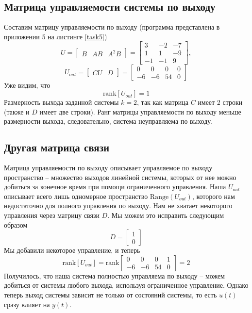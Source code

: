 \documentclass[a4paper, 12pt]{article}
\begin{document}
    \subsection{Матрица управляемости системы по выходу}
    Составим матрицу управляемости по выходу (программа представлена в приложении 5 на листинге \ref{task5})
    $$
    U=\begin{bmatrix}
        B &AB & A^2B
    \end{bmatrix}=\begin{bmatrix}
        3    &-2    &-7\\
     1     &1    &-9\\
    -1    &-1     &9
    \end{bmatrix},
    $$
    $$
    U_{out}=\begin{bmatrix}
        CU &D
    \end{bmatrix}=\begin{bmatrix}
        0     &0     &0     &0\\
    -6    &-6    &54     &0
    \end{bmatrix}
    $$
    Уже видим, что
    $$
    \text{rank}\left[U_{out}\right]=1
    $$
    Размерность выхода заданной системы $k=2$, так как матрица $C$ имеет 2 строки (также и $D$ имеет две строки).
    Ранг матрицы управляемости по выходу меньше размерности выхода, следовательно, система неуправляема по выходу.


    \subsection{Другая матрица связи}
    Матрица управляемости по выходу описывает управляемое по выходу пространство -- множество выходов
    линейной системы, которых от нее можно добиться за конечное время при помощи ограниченного управления.
    Наша $U_{out}$ описывает всего лишь одномерное пространство $\text{Range}\left(U_{out}\right)$, которого нам недостаточно для полного управления
    по выходу. Нам не хватает некоторого управления через матрицу связи $D$. Мы можем это исправить следующим образом
    $$
    D=\begin{bmatrix}
        1\\ 0
    \end{bmatrix}
    $$
    Мы добавили некоторое управление, и теперь
    $$\text{rank}\left[U_{out}\right]=\text{rank}\begin{bmatrix}
    0     &0     &0     &1\\
    -6    &-6    &54     &0
    \end{bmatrix}=2$$
    Получилось, что наша система полностью управляема по выходу -- можем добиться от системы любого выхода, используя ограниченное управление.
    Однако теперь выход системы зависит не только от состояний системы, то есть $u(t)$ сразу влияет на $y(t)$.
\end{document}
